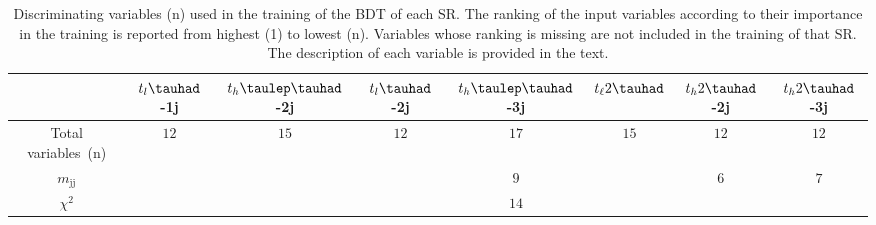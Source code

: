 \documentclass[PAPER, coverpage, atlasdraft=true, texlive=2016, UKenglish]{\ATLASLATEXPATH atlasdoc}
\providecommand{\DIFadd}[1]{{\protect\color{blue}\uwave{#1}}} %
\providecommand{\DIFdel}[1]{{\protect\color{red}\sout{#1}}}                      %
\providecommand{\DIFaddFL}[1]{\DIFadd{#1}} %
\providecommand{\DIFdelFL}[1]{\DIFdel{#1}} %
\providecommand{\DIFaddbeginFL}{} %
\providecommand{\DIFaddendFL}{} %
\providecommand{\DIFdelbeginFL}{} %
\providecommand{\DIFdelendFL}{} %
\begin{document}
\begin{table}[t!]
  \caption{\DIFdelbeginFL %
\DIFdelendFL \DIFaddbeginFL \small{Discriminating variables (n) used in the training of the BDT of each SR. 
The ranking of the input variables according to their importance in the training is reported from highest (1) to 
lowest (n). Variables whose ranking is missing are not included in the training of that SR. The description of each variable is provided in the text.}\DIFaddendFL }
\label{tab:importance}
 \centering
 \DIFaddbeginFL \vspace{0.2cm}
 \DIFaddendFL \begin{tabular}{cccccccc} \toprule\toprule
   & \DIFdelbeginFL \DIFdelFL{$t_{l}\tauhad$}\DIFdelendFL \DIFaddbeginFL \DIFaddFL{$t_{\ell}\tauhad$}\DIFaddendFL -1j                                  &  $t_{h}\tlhad$-2j   &  \DIFdelbeginFL \DIFdelFL{$t_{l}\tauhad$}\DIFdelendFL \DIFaddbeginFL \DIFaddFL{$t_{\ell}\tauhad$}\DIFaddendFL -2j & $t_{h}\tlhad$-3j & $t_{\ell}2\tauhad$     & $t_h2\tauhad$-2j & $t_h2\tauhad$-3j       \\\midrule
   Total variables~(n)                           & $12$\DIFaddbeginFL \DIFaddFL{~~ }\DIFaddendFL & $15$\DIFaddbeginFL \DIFaddFL{~~ }\DIFaddendFL & $12$\DIFaddbeginFL \DIFaddFL{~~ }\DIFaddendFL & $17$\DIFaddbeginFL \DIFaddFL{~~ }\DIFaddendFL & $15$\DIFaddbeginFL \DIFaddFL{~~ }\DIFaddendFL & $12$\DIFaddbeginFL \DIFaddFL{~~ }\DIFaddendFL & $12$\DIFaddbeginFL \DIFaddFL{~~ }\DIFaddendFL \\\midrule 
 $m_{\text{jj}}$                                      &   &             &           & $9$      &       & $6$      & $7$\\
 $\chi^{2}$                                          &   &             &           & $14$\DIFaddbeginFL \DIFaddFL{~~     }\DIFaddendFL &       &  &       \\

\end{tabular}
\end{table}
\end{document}
